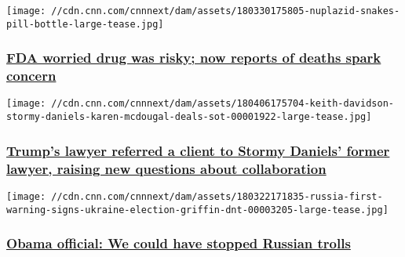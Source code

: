\href{/2018/04/09/health/parkinsons-drug-nuplazid-invs/index.html}{}

\texttt{[image: //cdn.cnn.com/cnnnext/dam/assets/180330175805-nuplazid-snakes-pill-bottle-large-tease.jpg]}

\hypertarget{fda-worried-drug-was-risky-now-reports-of-deaths-spark-concern}{%
\subsubsection{\texorpdfstring{\href{/2018/04/09/health/parkinsons-drug-nuplazid-invs/index.html}{FDA
worried drug was risky; now reports of deaths spark
concern}}{FDA worried drug was risky; now reports of deaths spark concern}}\label{fda-worried-drug-was-risky-now-reports-of-deaths-spark-concern}}

\href{/2018/04/06/politics/michael-cohen-referred-keith-davidson-client-invs/index.html}{}

\texttt{[image: //cdn.cnn.com/cnnnext/dam/assets/180406175704-keith-davidson-stormy-daniels-karen-mcdougal-deals-sot-00001922-large-tease.jpg]}

\hypertarget{trumps-lawyer-referred-a-client-to-stormy-daniels-former-lawyer-raising-new-questions-about-collaboration}{%
\subsubsection{\texorpdfstring{\href{/2018/04/06/politics/michael-cohen-referred-keith-davidson-client-invs/index.html}{Trump's
lawyer referred a client to Stormy Daniels' former lawyer, raising new
questions about
collaboration}}{Trump's lawyer referred a client to Stormy Daniels' former lawyer, raising new questions about collaboration}}\label{trumps-lawyer-referred-a-client-to-stormy-daniels-former-lawyer-raising-new-questions-about-collaboration}}

\href{/2018/03/26/politics/brett-bruen-russian-meddling-election/index.html}{}

\texttt{[image: //cdn.cnn.com/cnnnext/dam/assets/180322171835-russia-first-warning-signs-ukraine-election-griffin-dnt-00003205-large-tease.jpg]}

\hypertarget{obama-official-we-could-have-stopped-russian-trolls}{%
\subsubsection{\texorpdfstring{\href{/2018/03/26/politics/brett-bruen-russian-meddling-election/index.html}{Obama
official: We could have stopped Russian
trolls}}{Obama official: We could have stopped Russian trolls}}\label{obama-official-we-could-have-stopped-russian-trolls}}

